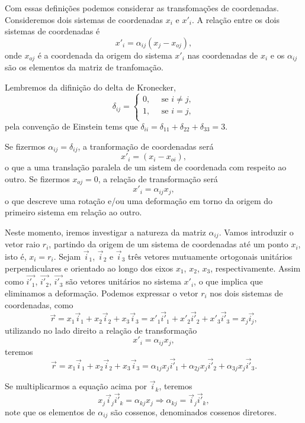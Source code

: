 Com essas defini\c{c}\~oes podemos considerar as
transfoma\c{c}\~oes de coordenadas. Consideremos dois sistemas de
 coordenadas $x_{i}$ e $x'_{i}$. A rela\c{c}\~ao entre os dois sistemas de coordenadas \'e
\[x'_{i}=\alpha_{ij}(x_{j}-x_{oj}),\]
onde $x_{oj}$ \'e a coordenada da origem do sistema $x'_{i}$ nas coordenadas de
$x_{i}$ e os $\alpha_{ij}$ s\~ao os elementos da matriz de
tranfoma\c{c}\~ao.

Lembremos da difini\c{c}\~ao do delta de Kronecker,
\[\delta_{ij}=\left \{ \begin{array}{l}
                0, \mbox{   }\mbox{   }\mbox{se } i \neq j,\\
                1, \mbox{   }\mbox{   }\mbox{se } i= j,\\
\end{array} \right.\]
pela conven\c{c}\~ao de Einstein tems que
$\delta_{ii}=\delta_{11}+\delta_{22}+\delta_{33}=3$.

Se fizermos $\alpha_{ij}=\delta_{ij}$, a tranforma\c{c}\~ao de
coordenadas ser\'a
\[x'_{i}=(x_{i}-x_{oi}),\]
o que a uma transla\c{c}\~ao paralela de um sistem de coordenada
com respeito ao outro. Se fizermos  $x_{oj}=0$, a rela\c{c}\~ao de
transforma\c{c}\~ao ser\'a
\[x'_{i}=\alpha_{ij}x_{j},\]
o que descreve uma rota\c{c}\~ao e/ou uma deforma\c{c}\~ao em torno da origem do primeiro
sistema em rela\c{c}\~ao ao outro.

Neste momento, iremos investigar a natureza da matriz
$\alpha_{ij}$. Vamos introduzir o vetor raio $r_{i}$, partindo da
origem de um sistema de coordenadas at\'e um ponto $x_{i}$, isto
\'e, $x_{i}=r_{i}$. Sejam $\vec{i}_{1}$, $\vec{i}_{2}$ e
$\vec{i}_{3}$ tr\^es vetores mutuamente ortogonais unit\'arios
perpendiculares e orientado ao longo dos eixos $x_{1}$, $x_{2}$,
$x_{3}$, respectivamente. Assim como $\vec{i'_{1}}$,
$\vec{i'_{2}}$, $\vec{i'_{3}}$ s\~ao vetores unit\'arios no
sistema $x'_{i}$, o que implica que eliminamos a deforma\c{c}\~ao.
Podemos expressar o vetor $r_{i}$ nos dois sistemas de
coordenadas, como
\[ \vec{r}=x_{1}\vec{i}_{1}+x_{2}\vec{i}_{2}+x_{3}\vec{i}_{3}=x'_{1}\vec{i'}_{1}+
x'_{2}\vec{i'}_{2}+x'_{3}\vec{i'}_{3}=x_{j}\vec{i_{j}},\]
utilizando no lado direito a rela\c{c}\~ao de transforma\c{c}\~ao
\[x'_{i}=\alpha_{ij}x_{j},\]
teremos
\[\vec{r}=x_{1}\vec{i}_{1}+x_{2}\vec{i}_{2}+
x_{3}\vec{i}_{3}=\alpha_{1j}x_{j}\vec{i'}_{1}+
\alpha_{2j}x_{j}\vec{i'}_{2}+\alpha_{3j}x_{j}\vec{i'}_{3}.\]

Se multiplicarmos a equa\c{c}\~ao acima por $\vec{i}_{k}$, teremos
\[x_{j}\vec{i}_{j}\vec{i'}_{k}=
\alpha_{kj}x_{j} \Rightarrow
\alpha_{kj}=\vec{i}_{j}\vec{i'}_{k},\] note que os elementos de
$\alpha_{ij}$ s\~ao cossenos, denominados cossenos diretores.

